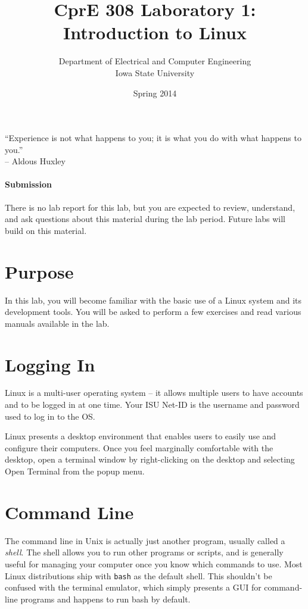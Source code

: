 \documentclass[letterpaper,10pt]{article}
\title{CprE 308 Laboratory 1: Introduction to Linux}
\author{Department of Electrical and Computer Engineering \\ Iowa State University}
\date{Spring 2014}
\newcommand{\cmd}[1]{\texttt{#1}}
\begin{document}
\maketitle

``Experience is not what happens to you; it is what you do with what happens to you.''\\ -- Aldous Huxley

\paragraph{Submission}
There is no lab report for this lab, but you are expected to review, understand, and ask questions about this material during the lab period. Future labs will build on this material.

\section{Purpose}
In this lab, you will become familiar with the basic use of a Linux system and its development tools. You will be asked to perform a few exercises and read various manuals available in the lab.

\section{Logging In}
Linux is a multi-user operating system -- it allows multiple users to have accounts and to be logged in at one time.
Your ISU Net-ID is the username and password used to log in to the OS.

Linux presents a desktop environment that enables users to easily use and configure their computers. Once you feel marginally comfortable with the desktop, open a terminal window by right-clicking on the desktop and selecting Open Terminal from the popup menu.

\section{Command Line}
The command line in Unix is actually just another program, usually called a \emph{shell}. The shell allows you to run other programs or scripts, and is generally useful for managing your computer once you know which commands to use. Most Linux distributions ship with \cmd{bash} as the default shell. This shouldn't be confused with the terminal emulator, which simply presents a GUI for command-line programs and happens to run bash by default.
\end{document}
